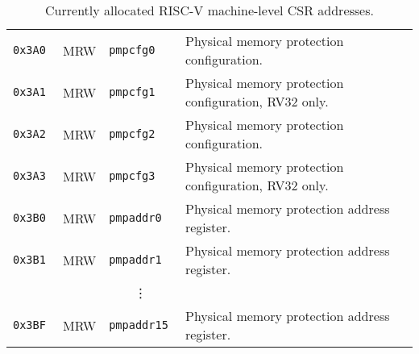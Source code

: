 \begin{table}[htb!]
\begin{center}
\begin{tabular}{|l|l|l|l|}
\tt 0x3A0 & MRW  &\tt pmpcfg0    & Physical memory protection configuration. \\
\tt 0x3A1 & MRW  &\tt pmpcfg1    & Physical memory protection configuration, RV32 only. \\
\tt 0x3A2 & MRW  &\tt pmpcfg2    & Physical memory protection configuration. \\
\tt 0x3A3 & MRW  &\tt pmpcfg3    & Physical memory protection configuration, RV32 only. \\
\tt 0x3B0 & MRW  &\tt pmpaddr0   & Physical memory protection address register. \\
\tt 0x3B1 & MRW  &\tt pmpaddr1   & Physical memory protection address register. \\
& & \multicolumn{1}{c|}{\vdots} & \ \\
\tt 0x3BF & MRW  &\tt pmpaddr15  & Physical memory protection address register. \\
\hline
\end{tabular}
\end{center}
\caption{Currently allocated RISC-V machine-level CSR addresses.}
\label{mcsrnames}
\end{table}

